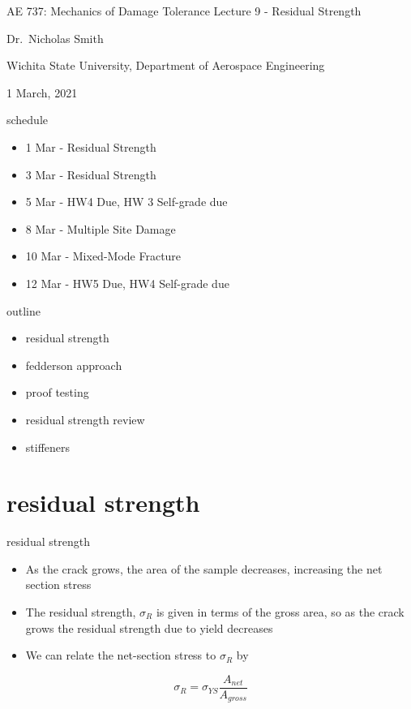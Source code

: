\documentclass[
  letterpaper,
  ignorenonframetext,
  aspectratio=43,
  handout,
  12pt]{beamer}
\author{}
\date{}
\providecommand{\tightlist}{%
  \setlength{\itemsep}{0pt}\setlength{\parskip}{0pt}}
\providecommand{\tightlist}{%
\setlength{\itemsep}{0pt}\setlength{\parskip}{0pt}}
\begin{document}
\begin{frame}{AE 737: Mechanics of Damage Tolerance}
\protect\hypertarget{ae-737-mechanics-of-damage-tolerance}{}
Lecture 9 - Residual Strength

Dr.~Nicholas Smith

Wichita State University, Department of Aerospace Engineering

1 March, 2021
\end{frame}

\begin{frame}{schedule}
\protect\hypertarget{schedule}{}
\begin{itemize}
\tightlist
\item
  1 Mar - Residual Strength
\item
  3 Mar - Residual Strength
\item
  5 Mar - HW4 Due, HW 3 Self-grade due
\item
  8 Mar - Multiple Site Damage
\item
  10 Mar - Mixed-Mode Fracture
\item
  12 Mar - HW5 Due, HW4 Self-grade due
\end{itemize}
\end{frame}

\begin{frame}{outline}
\protect\hypertarget{outline}{}
\begin{itemize}
\tightlist
\item
  residual strength
\item
  fedderson approach
\item
  proof testing
\item
  residual strength review
\item
  stiffeners
\end{itemize}
\end{frame}

\hypertarget{residual-strength}{%
\section{residual strength}\label{residual-strength}}

\begin{frame}{residual strength}
\protect\hypertarget{residual-strength-1}{}
\begin{itemize}
\tightlist
\item
  As the crack grows, the area of the sample decreases, increasing the
  net section stress
\item
  The residual strength, \(\sigma_R\) is given in terms of the gross
  area, so as the crack grows the residual strength due to yield
  decreases
\item
  We can relate the net-section stress to \(\sigma_R\) by
\end{itemize}

\[\sigma_R = \sigma_{YS} \frac{A_{net}}{A_{gross}}\]
\end{frame}
\end{document}
